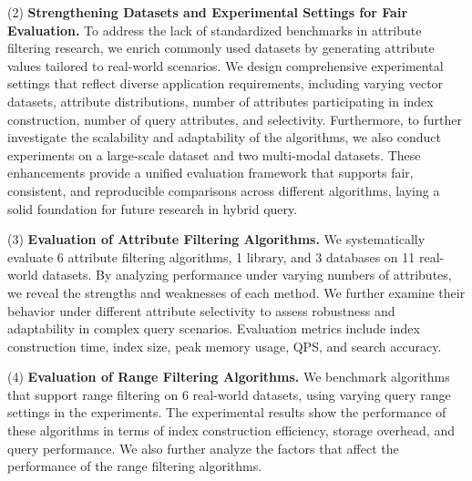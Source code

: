 \documentclass[sigconf, nonacm, pdfa]{acmart}
\begin{document}
	
	(2) \textbf{Strengthening Datasets and Experimental Settings for Fair Evaluation.}
	To address the lack of standardized benchmarks in attribute filtering research, we enrich commonly used datasets by generating attribute values tailored to real-world scenarios. We design comprehensive experimental settings that reflect diverse application requirements, including varying vector datasets, attribute distributions, number of attributes participating in index construction, number of query attributes, and selectivity. Furthermore, to further investigate the scalability and adaptability of the algorithms, we also conduct experiments on a large-scale dataset and two multi-modal datasets.  These enhancements provide a unified evaluation framework that supports fair, consistent, and reproducible comparisons across different algorithms, laying a solid foundation for future research in hybrid query.






	(3)\textbf{ Evaluation of Attribute Filtering Algorithms.}
	We systematically evaluate 6 attribute filtering algorithms, 1 library, and 3 databases on 11 real-world datasets. By analyzing performance under varying numbers of attributes, we reveal the strengths and weaknesses of each method. We further examine their behavior under different attribute selectivity to assess robustness and adaptability in complex query scenarios. Evaluation metrics include index construction time, index size, peak memory usage, QPS, and search accuracy.



	(4)\textbf{ Evaluation of Range Filtering Algorithms.}
	We benchmark algorithms that support range filtering on 6 real-world datasets, using varying query range settings in the experiments. The experimental results show the performance of these algorithms in terms of index construction efficiency, storage overhead, and query performance. We also further analyze the factors that affect the performance of the range filtering algorithms.
\end{document}
